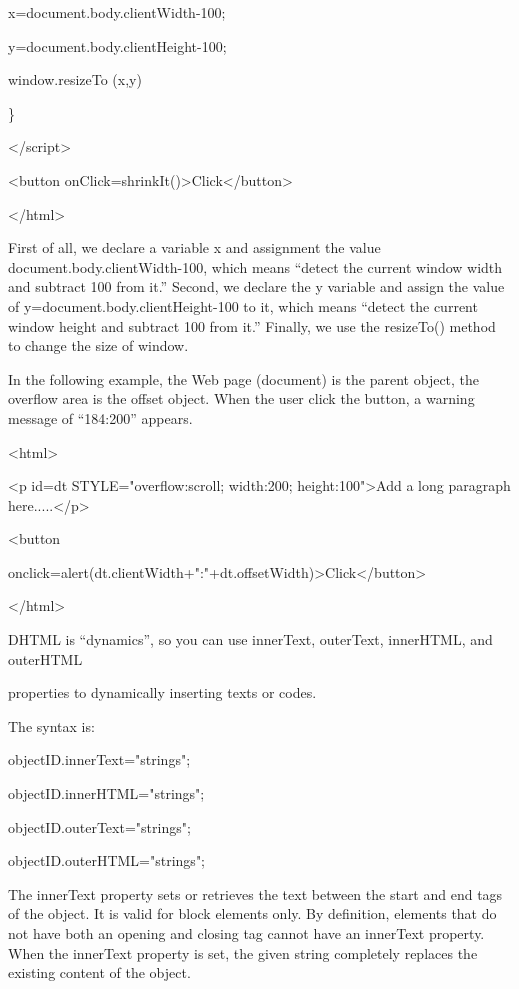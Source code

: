 \documentclass[
]{article}
\begin{document}
x=document.body.clientWidth-100;

y=document.body.clientHeight-100;

window.resizeTo (x,y)

\}

\textless/script\textgreater{}

\textless button
onClick=shrinkIt()\textgreater Click\textless/button\textgreater{}

\textless/html\textgreater{}

First of all, we declare a variable x and assignment the value
document.body.clientWidth-100, which means ``detect the current window
width and subtract 100 from it.'' Second, we declare the y variable and
assign the value of y=document.body.clientHeight-100 to it, which means
``detect the current window height and subtract 100 from it.'' Finally,
we use the resizeTo() method to change the size of window.

In the following example, the Web page (document) is the parent object,
the overflow area is the offset object. When the user click the button,
a warning message of ``184:200'' appears.

\textless html\textgreater{}

\textless p id=dt STYLE="overflow:scroll; width:200;
height:100"\textgreater Add a long paragraph
here.....\textless/p\textgreater{}

\textless button

onclick=alert(dt.clientWidth+":"+dt.offsetWidth)\textgreater Click\textless/button\textgreater{}

\textless/html\textgreater{}

DHTML is ``dynamics'', so you can use innerText, outerText, innerHTML,
and outerHTML

properties to dynamically inserting texts or codes.

The syntax is:

objectID.innerText="strings"; \textbf{}

objectID.innerHTML="strings";

objectID.outerText="strings";

objectID.outerHTML="strings";

The innerText property sets or retrieves the text between the start and
end tags of the object. It is valid for block elements only. By
definition, elements that do not have both an opening and closing tag
cannot have an innerText property. When the innerText property is set,
the given string completely replaces the existing content of the object.
\end{document}
